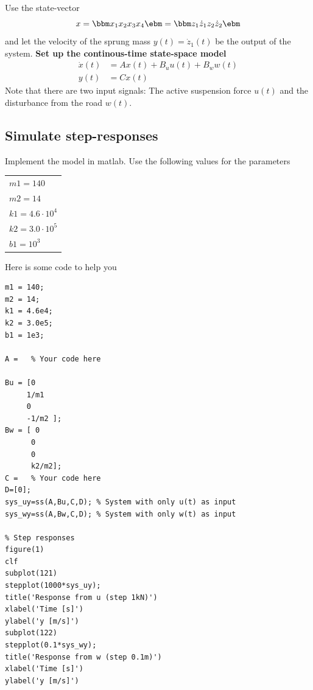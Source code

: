 \documentclass[a4paper]{scrartcl}
\begin{document}
Use the state-vector     
\[ x = \bbm x_1\\x_2\\x_3\\x_4 \ebm = \bbm z_1\\ \dot{z}_1 \\ z_2\\ \dot{z}_2 \ebm \]
and let the velocity of the sprung mass $y(t) = \dot{z}_1(t)$ be the output of the system. 
\textbf{Set up the continous-time state-space model}
\begin{equation*}
\begin{aligned}
\dot{x}(t) &= Ax(t) + B_u u(t) + B_w w(t)\\
y(t) &= C x(t)
\end{aligned}
\end{equation*}
Note that there are two input signals: The active suspension force $u(t)$ and the disturbance from the road $w(t)$.

\subsection*{Simulate step-responses}
\label{sec-2-2}
Implement the model in matlab. Use the following values for the parameters
\begin{center}
\begin{tabular}{l}
$m1 = 140$\\
$m2 = 14$\\
$k1 = 4.6\cdot{}10^4$\\
$k2 = 3.0\cdot{}10^5$\\
$b1 = 10^3$\\
\end{tabular}
\end{center}
Here is some code to help you
\begin{verbatim}
m1 = 140;
m2 = 14;
k1 = 4.6e4;
k2 = 3.0e5;
b1 = 1e3;

A =   % Your code here

Bu = [0  
     1/m1
     0
     -1/m2 ];
Bw = [ 0
      0
      0
      k2/m2];
C =   % Your code here
D=[0];
sys_uy=ss(A,Bu,C,D); % System with only u(t) as input
sys_wy=ss(A,Bw,C,D); % System with only w(t) as input

% Step responses
figure(1)
clf
subplot(121)
stepplot(1000*sys_uy);
title('Response from u (step 1kN)')
xlabel('Time [s]')
ylabel('y [m/s]')
subplot(122)
stepplot(0.1*sys_wy);
title('Response from w (step 0.1m)')
xlabel('Time [s]')
ylabel('y [m/s]')
\end{verbatim}
\end{document}
